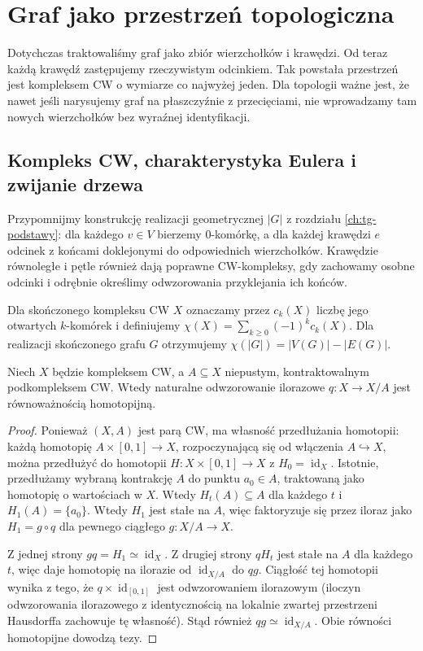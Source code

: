 \chapter{Graf jako przestrzeń topologiczna}
\label{ch:tg-topology}

Dotychczas traktowaliśmy graf jako zbiór wierzchołków i krawędzi.
Od teraz każdą krawędź zastępujemy rzeczywistym odcinkiem.
Tak powstała przestrzeń jest kompleksem CW o wymiarze
co najwyżej jeden.
Dla topologii ważne jest, że nawet jeśli narysujemy graf
na płaszczyźnie z przecięciami, nie wprowadzamy tam
nowych wierzchołków bez wyraźnej identyfikacji.

\section{Kompleks CW, charakterystyka Eulera i zwijanie drzewa}
\label{sec:tg-collapse-tree}

Przypomnijmy konstrukcję realizacji geometrycznej $|G|$
z rozdziału \ref{ch:tg-podstawy}: dla każdego $v\in V$ bierzemy
$0$-komórkę, a dla każdej krawędzi $e$ odcinek z końcami
doklejonymi do odpowiednich wierzchołków. Krawędzie
równoległe i pętle również dają poprawne CW-kompleksy,
gdy zachowamy osobne odcinki i odrębnie określimy odwzorowania
przyklejania ich końców.

\begin{definicja}
Dla skończonego kompleksu CW $X$ oznaczamy przez $c_k(X)$
liczbę jego otwartych $k$-komórek i definiujemy
$\chi(X)=\sum_{k\ge0}(-1)^k c_k(X)$.
Dla realizacji skończonego grafu $G$ otrzymujemy
$\chi(|G|)=|V(G)|-|E(G)|$.
\end{definicja}

\begin{lemat}
\label{lem:tg-collapse-CW}
Niech $X$ będzie kompleksem CW, a $A\subseteq X$
niepustym, kontraktowalnym podkompleksem CW.
Wtedy naturalne odwzorowanie ilorazowe $q:X\to X/A$
jest równoważnością homotopijną.
\end{lemat}

\begin{proof}
Ponieważ $(X,A)$ jest parą CW, ma własność przedłużania
homotopii: każdą homotopię $A\times[0,1]\to X$,
rozpoczynającą się od włączenia $A\hookrightarrow X$,
można przedłużyć do homotopii $H:X\times[0,1]\to X$
z $H_0=\operatorname{id}_X$. Istotnie, przedłużamy
wybraną kontrakcję $A$ do punktu $a_0\in A$,
traktowaną jako homotopię o wartościach w $X$.
Wtedy $H_t(A)\subseteq A$ dla każdego $t$
i $H_1(A)=\{a_0\}$. Wtedy $H_1$ jest stałe na $A$,
więc faktoryzuje się przez iloraz jako $H_1=g\circ q$
dla pewnego ciągłego $g:X/A\to X$.

Z jednej strony $gq=H_1\simeq\operatorname{id}_X$.
Z drugiej strony $qH_t$ jest stałe na $A$ dla każdego $t$,
więc daje homotopię na ilorazie od
$\operatorname{id}_{X/A}$ do $qg$. Ciągłość tej homotopii
wynika z tego, że $q\times\operatorname{id}_{[0,1]}$
jest odwzorowaniem ilorazowym (iloczyn odwzorowania
ilorazowego z identycznością na lokalnie zwartej
przestrzeni Hausdorffa zachowuje tę własność).
Stąd również $qg\simeq\operatorname{id}_{X/A}$.
Obie równości homotopijne dowodzą tezy.
\end{proof}


